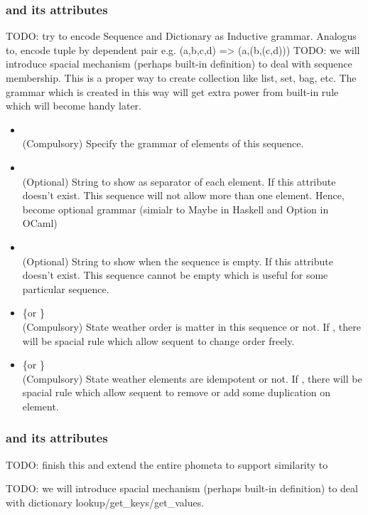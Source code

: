 \subsubsection{\kSequence and its attributes}
TODO: try to encode Sequence and Dictionary as Inductive grammar. Analogus to, encode tuple by dependent pair e.g. (a,b,c,d) => (a,(b,(c,d)))
TODO: we will introduce spacial mechanism (perhaps built-in definition) to deal with sequence membership.
This is a proper way to create collection like list, set, bag, etc. The grammar which is created in this way will get extra power from built-in rule which will become handy later.
\begin{itemize}
    \item \kSubGrammar {} \\
    (Compulsory) Specify the grammar of elements of this sequence.
    \item \kDelimiter {} \\
    (Optional) String to show as separator of each element. If this attribute doesn't exist. This sequence will not allow more than one element. Hence, become optional grammar (simialr to Maybe in Haskell and Option in OCaml)
    \item \kWhenEmpty {} \\
    (Optional) String to show when the sequence is empty. If this attribute doesn't exist. This sequence cannot be empty which is useful for some particular sequence.
    \item \kCommutative \{\kTrue or \kFalse\} \\
    (Compulsory) State weather order is matter in this sequence or not. If \kTrue, there will be spacial rule which allow sequent to change order freely.
    \item \kIdempotent \{\kTrue or \kFalse\} \\
    (Compulsory) State weather elements are idempotent or not. If \kTrue, there will be spacial rule which allow sequent to remove or add some duplication on element.
\end{itemize}

\subsubsection{\kDictionary and its attributes}
TODO: finish this and extend the entire phometa to support \kDictionary similarity to \kSequence

TODO: we will introduce spacial mechanism (perhaps built-in definition) to deal with dictionary lookup/get\_keys/get\_values.

